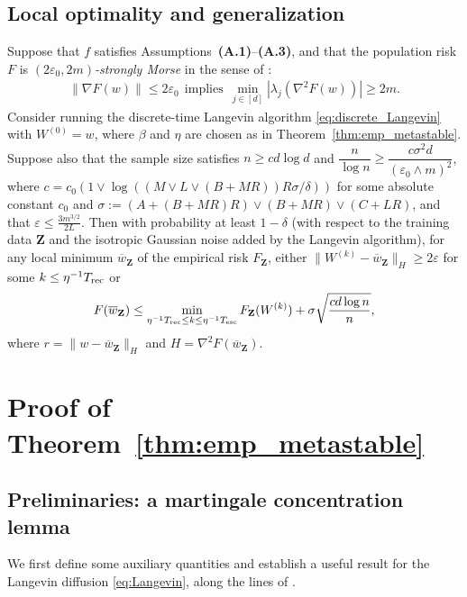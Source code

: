 \documentclass[final,12pt]{colt2018}
\numberwithin{equation}{section}
\numberwithin{equation}{section}
\def\deq{:=}
\def\bd#1{\mathbf{#1}}
\def\bZ{\bd{Z}}
\def\barw{\overline{w}}
\def\eps{\varepsilon}
\begin{document}
\subsection{Local optimality and generalization}

\begin{theorem}\label{thm:margin-generalization} Suppose that $f$ satisfies Assumptions~{\bf(A.1)}--{\bf(A.3)}, and that the population risk $F$ is {\em $(2\eps_0,2m)$-strongly Morse} in the sense of \cite*{mei2016landscape}:
	\begin{align*}
		\| \nabla F(w) \| \leq 2\eps_0 ~~\text{implies}~~ \min_{j \in [d]} |\lambda_j (\nabla^2 F(w))| \geq 2m.
	\end{align*}
Consider running the discrete-time Langevin algorithm \eqref{eq:discrete_Langevin} with $W^{(0)}=w$, where $\beta$ and $\eta$ are chosen as in Theorem~\ref{thm:emp_metastable}. Suppose also that the sample size satisfies $n \ge cd\log d$ and $\dfrac{n}{\log n} \ge \dfrac{c\sigma^2d}{(\eps_0 \wedge m)^2}$, where $c = c_0 \left(1 \vee \log((M\vee L\vee (B+MR))R\sigma/\delta)\right)$ for some absolute constant $c_0$ and $\sigma  \deq (A+(B+MR)R) \vee (B + MR) \vee (C + LR)$, and that $\eps \le \frac{3m^{3/2}}{2L}$. Then with probability at least $1-\delta$ (with respect to the training data $\bZ$ and the isotropic Gaussian noise added by the Langevin algorithm),  for any local minimum $\barw_\bZ$ of the empirical risk $F_\bZ$, either $\|W^{(k)}-\barw_\bZ\|_H \ge 2\eps$ for some $k \le \eta^{-1}T_{\rm rec}$ or
\begin{align}
	F(\barw_\bZ) \le \min_{\eta^{-1}T_{\rm rec} \le k \le \eta^{-1}T_{\rm esc}} F_\bZ(W^{(k)}) + \sigma\sqrt{\frac{cd\log n}{n}},
\end{align}
where $r = \|w-\barw_\bZ\|_H$ and $H = \nabla^2F(\barw_\bZ)$.
\end{theorem}


\section{Proof of Theorem~\ref{thm:emp_metastable}}

\subsection{Preliminaries: a martingale concentration lemma}

We first define some auxiliary quantities and establish a useful result for the Langevin diffusion \eqref{eq:Langevin}, along the lines of \cite{berglund_gentz_pathwise}.
\end{document}
